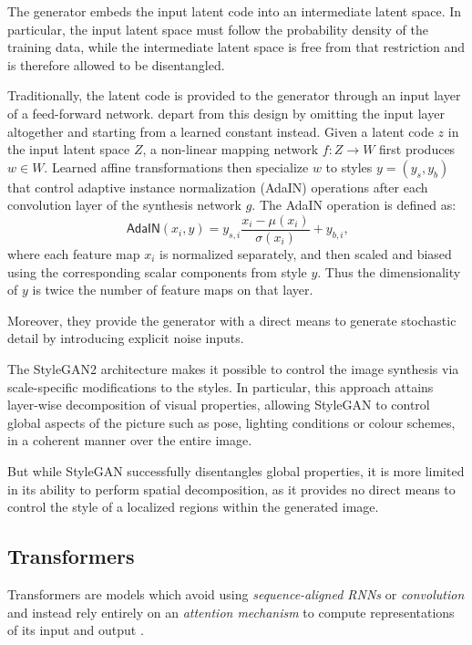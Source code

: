\documentclass{article}
\begin{document}
	The generator embeds the input latent code into an intermediate latent space. In particular, the input 
	latent space must follow the probability density of the training data, while the intermediate latent 
	space is free from that restriction and is therefore allowed to be disentangled. 

	Traditionally, the latent code is provided to the generator through an input layer of a feed-forward 
	network. \citet{karras2020analyzing} depart from this design by omitting the input layer altogether 
	and starting from a learned constant instead. 
	Given a latent code $z$ in the input latent space $Z$, a non-linear mapping network $f : Z 
	\rightarrow W$ first produces $w \in W $.
	Learned affine transformations then specialize $w$ to styles $y = (y_s, y_b)$ that control adaptive 
	instance normalization (AdaIN) \cite{?} operations after each convolution layer of the synthesis 
	network $g$. The AdaIN operation is defined as:
	\begin{equation}
		\label{e:adain}
		\mathsf{AdaIN}(x_i, y) = y_{s, i} \frac{x_i - \mu(x_i)}{\sigma (x_i)} + y_{b,i} \mbox{,}
	\end{equation}
	where each feature map $x_i$ is normalized separately, and then scaled and biased using the 
	corresponding scalar components from style $y$. Thus the dimensionality of $y$ is twice the 
	number of feature maps on that layer.
	
	Moreover, they provide the generator with a direct means to generate stochastic detail by 
	introducing explicit noise inputs. 

	The StyleGAN2 architecture makes it possible to control the image synthesis via scale-specific 
	modifications to the styles. In particular, this approach attains layer-wise decomposition of visual 
	properties, allowing StyleGAN to control global aspects of the picture such as pose, lighting 
	conditions or colour schemes, in a coherent manner over the entire image. 
	
	But while StyleGAN successfully disentangles global properties, it is more limited in its ability to 
	perform spatial decomposition, as it provides no direct means to control the style of a localized 
	regions within the generated image.
	
	
	\subsection{Transformers}%
	Transformers are models which avoid using \textit{sequence-aligned RNNs} or \textit{convolution} 
	and instead rely entirely on an \textit{attention mechanism} to compute representations of its input 
	and output \cite{vaswani2017attention}.
	
\end{document}
